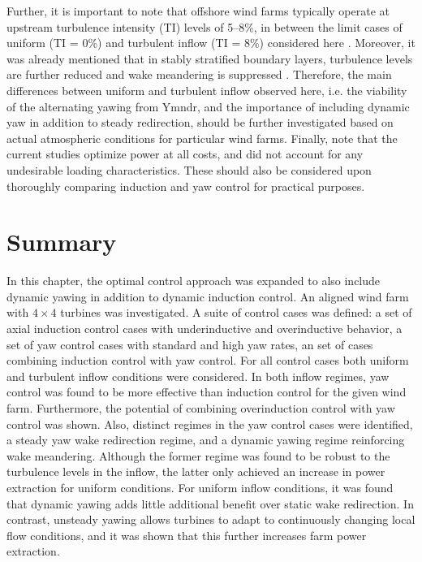 Further, it is important to note that offshore wind farms typically operate at upstream turbulence intensity (TI) levels of 5--8\%, in between the limit cases of uniform (TI = 0\%) and turbulent inflow (TI = 8\%) considered here \cite{barthelmie2005ten, barthelmie2009modelling}. Moreover, it was already mentioned that in stably stratified boundary layers, turbulence levels are further reduced and wake meandering is suppressed \citep{larsen2009dependence,machefaux2016experimental}. Therefore, the main differences between uniform and turbulent inflow observed here, i.e. the viability of the alternating yawing from Ymndr, and the importance of including dynamic yaw in addition to steady redirection, should be further investigated based on actual atmospheric conditions for particular wind farms. Finally, note that the current studies optimize power at all costs, and did not account for any undesirable loading characteristics. These should also be considered upon thoroughly comparing induction and yaw control for practical purposes.

\section{Summary} \label{sec:opt_yaw_concl}
In this chapter, the optimal control approach was expanded to also include dynamic yawing in addition to dynamic induction control. An aligned wind farm with $4 \times 4$ turbines was investigated. A suite of control cases was defined: a set of axial induction control cases with underinductive and overinductive behavior, a set of yaw control cases with standard and high yaw rates, an set of cases combining induction control with yaw control. For all control cases both uniform and turbulent inflow conditions were considered. In both inflow regimes, yaw control was found to be more effective than induction control for the given wind farm. Furthermore, the potential of combining overinduction control with yaw control was shown. Also, distinct regimes in the yaw control cases were identified, a steady yaw wake redirection regime, and a dynamic yawing regime reinforcing wake meandering. Although the former regime was found to be robust to the turbulence levels in the inflow, the latter only achieved an increase in power extraction for uniform conditions. For uniform inflow conditions, it was found that dynamic yawing adds little additional benefit over static wake redirection. In contrast, unsteady yawing allows turbines to adapt to continuously changing local flow conditions, and it was shown that this further increases farm power extraction. 





\cleardoublepage

